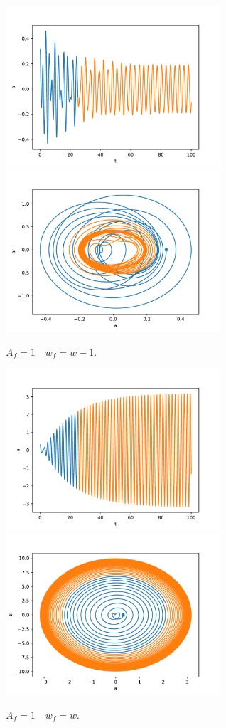             \begin{figure}[H]
                \centering
                \includegraphics[width=8cm]{pictures/5resonance2.pdf}
                \includegraphics[width=8cm]{pictures/5resonance2p.pdf}
                \caption{$A_f = 1 \quad w_f = w-1$.}
            \end{figure}

            \begin{figure}[H]
                \centering
                \includegraphics[width=8cm]{pictures/5resonance3.pdf}
                \includegraphics[width=8cm]{pictures/5resonance3p.pdf}
                \caption{$A_f = 1 \quad w_f = w$.}
            \end{figure}

